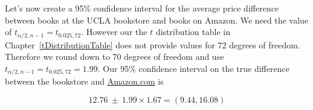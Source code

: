 

Let's now create a 95\% confidence interval for the average price difference between books at the UCLA bookstore and books on Amazon.
We need the value of $t_{\alpha/2, n-1} = t_{0.025, 72}$.
However our the $t$ distribution table in Chapter~\ref{tDistributionTable} does not 
provide values for 72 degrees of freedom.
Therefore we round down to 70 degrees of freedom and use
$t_{\alpha/2, n-1} = t_{0.025, 72} = 1.99$.
Our 95\% confidence interval on the true difference between the bookstore and 
\href{http://www.amazon.com}{Amazon.com} is

\begin{equation*}
12.76 \ \pm\ 1.99\times 1.67 = (9.44,  16.08)
\end{equation*}

